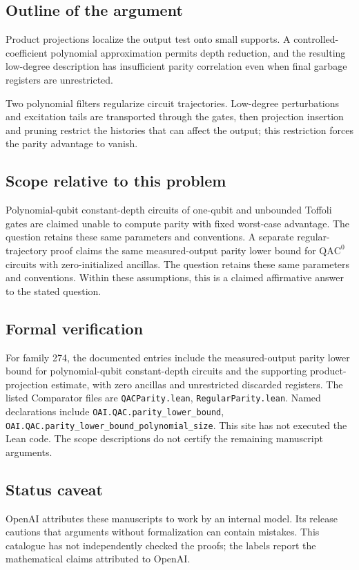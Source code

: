 \documentclass[11pt]{article}
\begin{document}
\subsection{Outline of the argument}
Product projections localize the output test onto small supports. A controlled-coefficient polynomial approximation permits depth reduction, and the resulting low-degree description has insufficient parity correlation even when final garbage registers are unrestricted.

Two polynomial filters regularize circuit trajectories. Low-degree perturbations and excitation tails are transported through the gates, then projection insertion and pruning restrict the histories that can affect the output; this restriction forces the parity advantage to vanish.

\subsection{Scope relative to this problem}
Polynomial-qubit constant-depth circuits of one-qubit and unbounded Toffoli gates are claimed unable to compute parity with fixed worst-case advantage. The question retains these same parameters and conventions. A separate regular-trajectory proof claims the same measured-output parity lower bound for $\mathrm{QAC}^0$ circuits with zero-initialized ancillas. The question retains these same parameters and conventions. Within these assumptions, this is a claimed affirmative answer to the stated question.

\subsection{Formal verification}
For family 274, the documented entries include the measured-output parity lower bound for polynomial-qubit constant-depth circuits and the supporting product-projection estimate, with zero ancillas and unrestricted discarded registers. The listed Comparator files are \texttt{QACParity.lean}, \texttt{RegularParity.lean}. Named declarations include \texttt{OAI.QAC.parity\_lower\_bound}, \texttt{OAI.QAC.parity\_lower\_bound\_polynomial\_size}. This site has not executed the Lean code. The scope descriptions do not certify the remaining manuscript arguments.

\subsection{Status caveat}
OpenAI attributes these manuscripts to work by an internal model. Its release cautions that arguments without formalization can contain mistakes. This catalogue has not independently checked the proofs; the labels report the mathematical claims attributed to OpenAI.
\end{document}
